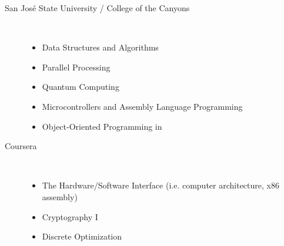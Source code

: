 \documentclass[10pt]{article}
\begin{document}
\spacedhrule{1.2em}{-0.7em}


\begin{multicols}{2}
	\begin{description}
		\item[\hspace{1em} San Jos\'{e} State University / College of the Canyons]{ \hfill \\[-1.5em]
		\begin{itemize}
			\item{Data Structures and Algorithms}
			\item{Parallel Processing}
			\item{Quantum Computing}
			\item{Microcontrollers and Assembly Language Programming}
			\item{Object-Oriented Programming in \CPP}
		\end{itemize}
		}
	\end{description}
	\begin{description}
		\item[\hspace{1em} Coursera]{ \hfill \\[-1.5em]
		\begin{itemize}
			\item{The Hardware/Software Interface (i.e. computer architecture, x86 assembly)}
			\item{Cryptography I}
			\item{Discrete Optimization}
		\end{itemize}
		}
	\end{description}
\end{multicols}
\end{document}
